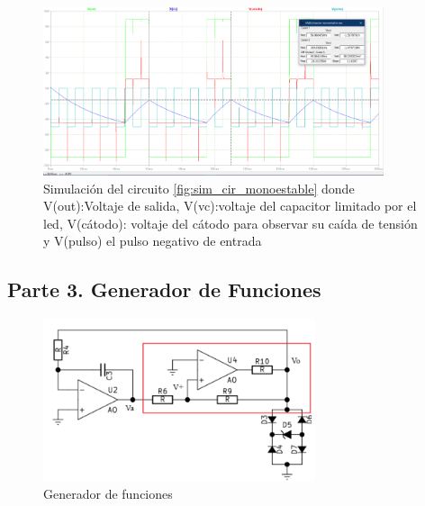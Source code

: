 \begin{enumerate}
                \begin{figure}[H]
                    \centering
                    \renewcommand{\figurename}{Gráfica}
                    \setcounter{figure}{9}
                    \includegraphics[width=10cm]{Imagenes/sim_monoestable.png}
                    \caption{Simulación del circuito \ref{fig:sim_cir_monoestable} donde V(out):Voltaje de salida,  V(vc):voltaje del capacitor limitado por el led, V(cátodo): voltaje del cátodo para observar su caída de tensión y V(pulso) el pulso negativo de entrada}
                    \label{fig:sim_monoestable}
                \end{figure}

                








            
        \end{enumerate}

    \subsection{Parte 3. Generador de Funciones} \label{subsec:met_parte3}

         \begin{figure}[H]
            \centering
            \setcounter{figure}{17}
            \includegraphics[width=8cm]{Circuitos/gf.png}
            \caption{Generador de funciones}
            \label{fig:gf}
        \end{figure}

